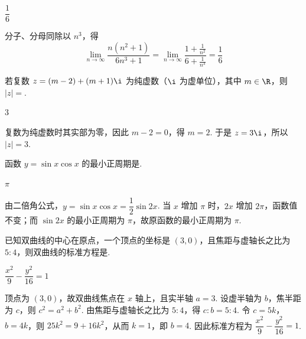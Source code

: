 \begin{answer}
\(\dfrac{1}{6}\)
\end{answer}

\begin{solution}
分子、分母同除以 \(n^3\)，得
\[
\lim_{n\to\infty}\frac{n(n^2+1)}{6n^3+1}=\lim_{n\to\infty}\frac{1+\frac{1}{n^2}}{6+\frac{1}{n^3}}=\frac{1}{6}
\]
\end{solution}

\begin{problem}
若复数 \(z = (m - 2) + (m + 1)\i\) 为纯虚数（\(\i\) 为虚单位），其中 \(m \in \R\)，则 \(|z| = \)\fillinblank{}.
\end{problem}

\begin{answer}
\(3\)
\end{answer}

\begin{solution}
复数为纯虚数时其实部为零，因此 \(m-2=0\)，得 \(m=2\). 于是 \(z=3\i\)，所以 \(|z|=3\).
\end{solution}

\begin{problem}
函数 \(y = \sin x \cos x\) 的最小正周期是\fillinblank{}.
\end{problem}

\begin{answer}
\(\pi\)
\end{answer}

\begin{solution}
由二倍角公式，\(y=\sin x\cos x=\dfrac{1}{2}\sin 2x\). 当 \(x\) 增加 \(\pi\) 时，\(2x\) 增加 \(2\pi\)，函数值不变；而 \(\sin 2x\) 的最小正周期为 \(\pi\)，故原函数的最小正周期为 \(\pi\).
\end{solution}

\begin{problem}
已知双曲线的中心在原点，一个顶点的坐标是 \((3,0)\)，且焦距与虚轴长之比为 \(5:4\)，则双曲线的标准方程是\fillinblank{}.
\end{problem}

\begin{answer}
\(\dfrac{x^2}{9} - \dfrac{y^2}{16} = 1\)
\end{answer}

\begin{solution}
顶点为 \((3,0)\)，故双曲线焦点在 \(x\) 轴上，且实半轴 \(a=3\). 设虚半轴为 \(b\)，焦半距为 \(c\)，则 \(c^2=a^2+b^2\). 由焦距与虚轴长之比为 \(5:4\)，得 \(c:b=5:4\). 令 \(c=5k\)，\(b=4k\)，则 \(25k^2=9+16k^2\)，从而 \(k=1\)，即 \(b=4\). 因此标准方程为 \(\dfrac{x^2}{9}-\dfrac{y^2}{16}=1\).
\end{solution}


